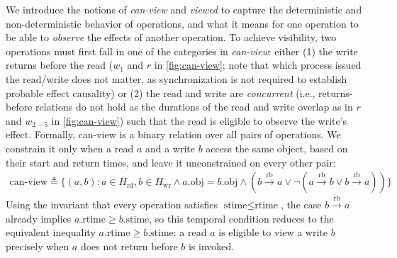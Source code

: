   We introduce the notions of \textit{can-view} and \textit{viewed}
  to capture the
  deterministic and non-deterministic behavior of operations,
  and what it means for one operation to be able to \textit{observe}
  the effects of another operation. To achieve visibility, two
  operations must first fall in one of
  the categories in \textit{can-view}: either (1) the write 
  returns before the read (\eg $w_1$ and $r$ in \cref{fig:can-view}; 
  note that which process issued the read/write does not matter, as synchronization is not required to establish probable effect causality)
  or (2) the read and write are \textit{concurrent} (i.e., returns-before relations do not hold as the durations of the read and write overlap
  as in $r$ and $w_{2-5}$ in \cref{fig:can-view}) such that the read is eligible to observe the write's effect.
  Formally, can-view is a binary relation over all pairs of operations. We
  constrain it only when a read $a$ and a write $b$ access the same object,
  based on their start and return times, and leave it unconstrained on every
  other pair:
  \begin{eqnarray*}
	  \text{can-view} \triangleq \{(a, b) : a \in H_\text{rd}, b \in H_\text{wr} \land a.\text{obj} = b.\text{obj}  \land 
		(b \xrightarrow{\text{rb}} a \lor \lnot(a \xrightarrow{\text{rb}} b \lor b \xrightarrow{\text{rb}} a))\}
  \end{eqnarray*}
  Using the invariant that every operation satisfies $\text{stime} \le
  \text{rtime}$, the case $b \xrightarrow{\text{rb}} a$ already implies
  $a.\text{rtime} \ge b.\text{stime}$, so this temporal condition reduces to the
  equivalent inequality $a.\text{rtime} \ge b.\text{stime}$: a read $a$ is
  eligible to view a write $b$ precisely when $a$ does not
  return before $b$ is invoked.

